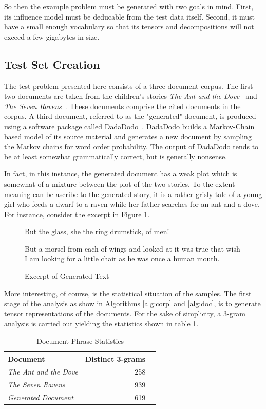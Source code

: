 \documentclass{article}
\begin{document}
So then the example problem must be generated with two goals in mind.
First, its influence model must be deducable from the test data itself.
Second, it must have a small enough vocabulary so that its tensors and
decompositions will not exceed a few gigabytes in size.

\subsection{Test Set Creation}
The test problem presented here consists of a three document corpus.
The first two documents are taken from the children's stories {\em The
Ant and the Dove}~\cite{aesop} and {\em The Seven
Ravens}~\cite{aesop}.  These documents comprise the cited documents in
the corpus.  A third document, referred to as the "generated"
document, is produced using a software package called
DadaDodo~\cite{dada}.  DadaDodo builds a Markov-Chain based model of
its source material and generates a new document by sampling the
Markov chains for word order probability.  The output of DadaDodo
tends to be at least somewhat grammatically correct, but is generally
nonsense. 

In fact, in this instance, the generated document has a weak plot
which is somewhat of a mixture between the plot of the two stories.
To the extent meaning can be ascribe to the generated story, it is
a rather grisly tale of a young girl who feeds a dwarf to a raven
while her father searches for an ant and a dove.  For instance,
consider the excerpt in Figure \ref{fig:gentext}.

\begin{figure}
  \begin{displayquote}
But the glass, she the ring drumstick, of men! 

But a morsel from each of wings and looked at it was true that wish I am
looking for a little chair as he was once a human mouth. 
  \end{displayquote}
  \caption{Excerpt of Generated Text}
  \label{fig:gentext}
\end{figure}

More interesting, of course, is the statistical situation of the
samples.  The first stage of the analysis as show in 
Algorithms \ref{alg:corp} and \ref{alg:doc}, is to generate tensor
representations of the documents.  For the sake of simplicity,
a 3-gram analysis is carried out yielding the statistics shown in
table \ref{tab:docstats}.

\begin{table}
    \begin{tabular}{l|r|r}
    {\bf Document} & {\bf Distinct 3-grams} \\
    \hline
    {\em The Ant and the Dove} & 258 \\
    {\em The Seven Ravens} & 939 \\
    \hline
    {\em Generated Document} & 619\\
    \end{tabular}
    \caption{Document Phrase Statistics}
    \label{tab:docstats}
\end{table}
\end{document}
